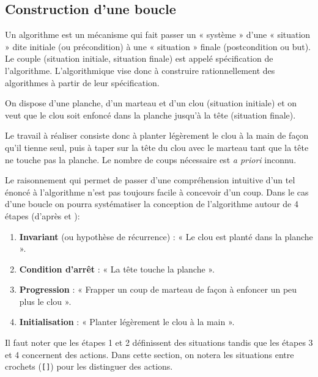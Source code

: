 \subsection{Construction d'une boucle}\label{invariant}
Un algorithme est un mécanisme qui fait passer un « système » d'une « situation »
dite initiale (ou précondition) à une « situation » finale (postcondition ou but). 
Le couple (situation initiale, situation finale) est appelé spécification de l'algorithme. 
L'algorithmique vise donc à construire rationnellement des algorithmes à partir de 
leur spécification.

\begin{ex}\label{ex:clou}
On dispose d'une planche, d'un marteau et d'un clou (situation initiale)
et on veut que le clou soit enfoncé dans la planche jusqu'à la tête (situation finale).

Le travail à réaliser consiste donc à planter légèrement le clou
à la main de façon qu'il tienne seul, puis à taper sur la tête du clou avec le marteau
tant que la tête ne touche pas la planche. Le nombre de coups nécessaire est {\em a priori}
inconnu.
\end{ex}
\noindent 
Le raisonnement qui permet de passer d'une compréhension intuitive d'un
tel énoncé à l'algorithme n'est pas toujours facile à concevoir d'un coup. 
Dans le cas d'une boucle on pourra systématiser la conception de l'algorithme
autour de 4 étapes (d'après \cite{didier} et \cite{guyomard}):
\begin{enumerate}
\item {\bf Invariant} (ou hypothèse de récurrence) : « Le clou est planté dans la planche ».
\item {\bf Condition d'arrêt} : « La tête touche la planche ».
\item {\bf Progression} : « Frapper un coup de marteau de façon à enfoncer un peu plus le clou ».
\item {\bf Initialisation} : « Planter légèrement le clou à la main ».
\end{enumerate}
Il faut noter que les étapes 1 et 2 définissent des situations
tandis que les étapes 3 et 4 concernent des actions. 
Dans cette section, on notera les situations entre crochets ({\tt []}) pour les distinguer
des actions.
